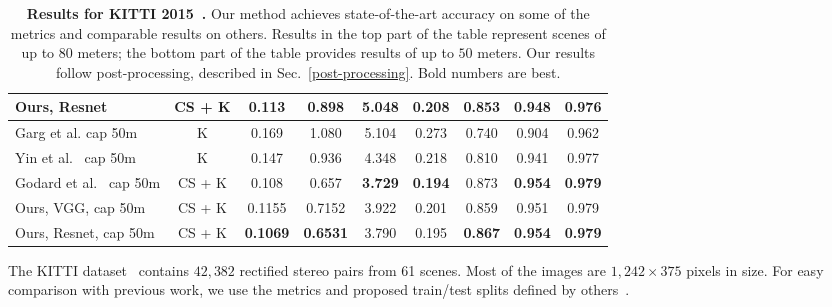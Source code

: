 \documentclass[10pt,twocolumn,letterpaper]{article}
\newcommand{\minisection}[1]{\vspace{1mm}\noindent{\textbf{#1}}}
\begin{document}
\begin{table*}[t]
{\begin{tabular}{lcccccccc}
			Ours, Resnet                                & CS + K  & \textbf{0.113}       & \textbf{0.898}       & 5.048               & 0.208                  & 0.853                    & 0.948                      & \textbf{0.976}            \\ \hline
			Garg et al. cap 50m~\cite{eigen2014depth}   & K       & 0.169                & 1.080                & 5.104               & 0.273                  & 0.740                    & 0.904                      & 0.962                     \\
			Yin et al.~\cite{geonet} cap 50m            & K       & 0.147                & 0.936                & 4.348               & 0.218                  & 0.810                    & 0.941                      & 0.977                     \\
			Godard et al.~\cite{monodepth17}  cap 50m   & CS + K  & 0.108                & 0.657                & \textbf{3.729}      & \textbf{0.194}         & 0.873                    & \textbf{0.954}             & \textbf{0.979}            \\
			Ours, VGG, cap 50m                          & CS + K  & 0.1155               & 0.7152               & 3.922               & 0.201                  & 0.859                    & 0.951                      & 0.979                     \\
			Ours, Resnet, cap 50m                       & CS + K  & \textbf{0.1069}      & \textbf{0.6531}      & 3.790               & 0.195                  & \textbf{0.867}           & \textbf{0.954}             & \textbf{0.979}            \\
			\bottomrule
		\end{tabular}
	}
	\vspace{0.1in}
	\caption{{\bf Results for KITTI 2015~\cite{Geiger2012AreSuite}.} Our method achieves state-of-the-art accuracy on some of the metrics and comparable results on others. Results in the top part of the table represent scenes of up to $80$ meters; the bottom part of the table provides results of up to $50$ meters. Our results follow post-processing, described in Sec.~\ref{post-processing}. Bold numbers are best.}
	\label{kitti-eigen-split}
\end{table*}


\minisection{KITTI Eigen split.}
The KITTI dataset~\cite{Geiger2012AreSuite} contains $42,382$ rectified stereo pairs from 61 scenes. Most of the images are $1,242 \times 375$ pixels in size. For easy comparison with previous work, we use the metrics and proposed train/test splits defined by others~\cite{eigen2014depth}.
\end{document}
